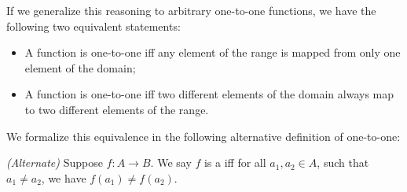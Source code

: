 If we generalize this reasoning to arbitrary one-to-one functions, we have the following two equivalent statements:
\begin{itemize}
\item
A function is one-to-one iff any element of the range is mapped from only one element of the domain;
\item
A function is one-to-one iff two different elements of the domain always map to two different elements of the range.
\end{itemize}

We formalize this equivalence in the following alternative definition of one-to-one:

\begin{defn} \label{121defn2}\emph{(Alternate)}
Suppose $f \colon A \to B$. We say $f$ is a  iff for all $a_1,a_2 \in A$, such that $a_1 \neq a_2$, we have $f(a_1) \neq f(a_2)$. 
\end{defn}



 





